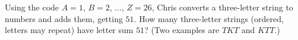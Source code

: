 Using the code $A=1$, $B=2$, $\dots$, $Z=26$, Chris converts a three-letter string to numbers and adds them, getting $51$. How many three-letter strings (ordered, letters may repeat) have letter sum $51$? (Two examples are $TKT$ and $KTT$.)
